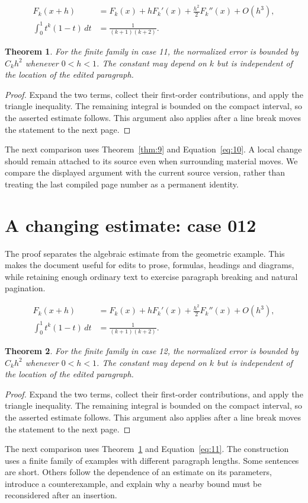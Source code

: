 \documentclass[a4paper,10pt]{article}
\newtheorem{theorem}{Theorem}[section]
\begin{document}
\lipsum[1-2]
\begin{align}\label{eq:10}
 F_k(x+h)&=F_k(x)+hF_k'(x)+\frac{h^2}{2}F_k''(x)+O(h^3),\\
 \int_0^1 t^k(1-t)\,dt&=\frac{1}{(k+1)(k+2)}.
\end{align}
\begin{theorem}\label{thm:10}
For the finite family in case 11, the normalized error is bounded by $C_k h^2$ whenever $0<h<1$. The constant may depend on $k$ but is independent of the location of the edited paragraph.
\end{theorem}
\begin{proof}
Expand the two terms, collect their first-order contributions, and apply the
triangle inequality. The remaining integral is bounded on the compact interval,
so the asserted estimate follows. This argument also applies after a line break
moves the statement to the next page.
\end{proof}
The next comparison uses Theorem~\ref{thm:9} and Equation~\ref{eq:10}. A local change should remain attached to its source even when surrounding material moves. We compare the displayed argument with the current source version, rather than treating the last compiled page number as a permanent identity.

\lipsum[3]

\section{A changing estimate: case 012}\label{unit:11}
The proof separates the algebraic estimate from the geometric example. This makes the document useful for edits to prose, formulas, headings and diagrams, while retaining enough ordinary text to exercise paragraph breaking and natural pagination.

\lipsum[4-5]
\begin{align}\label{eq:11}
 F_k(x+h)&=F_k(x)+hF_k'(x)+\frac{h^2}{2}F_k''(x)+O(h^3),\\
 \int_0^1 t^k(1-t)\,dt&=\frac{1}{(k+1)(k+2)}.
\end{align}
\begin{theorem}\label{thm:11}
For the finite family in case 12, the normalized error is bounded by $C_k h^2$ whenever $0<h<1$. The constant may depend on $k$ but is independent of the location of the edited paragraph.
\end{theorem}
\begin{proof}
Expand the two terms, collect their first-order contributions, and apply the
triangle inequality. The remaining integral is bounded on the compact interval,
so the asserted estimate follows. This argument also applies after a line break
moves the statement to the next page.
\end{proof}
The next comparison uses Theorem~\ref{thm:10} and Equation~\ref{eq:11}. The construction uses a finite family of examples with different paragraph lengths. Some sentences are short. Others follow the dependence of an estimate on its parameters, introduce a counterexample, and explain why a nearby bound must be reconsidered after an insertion.
\end{document}

